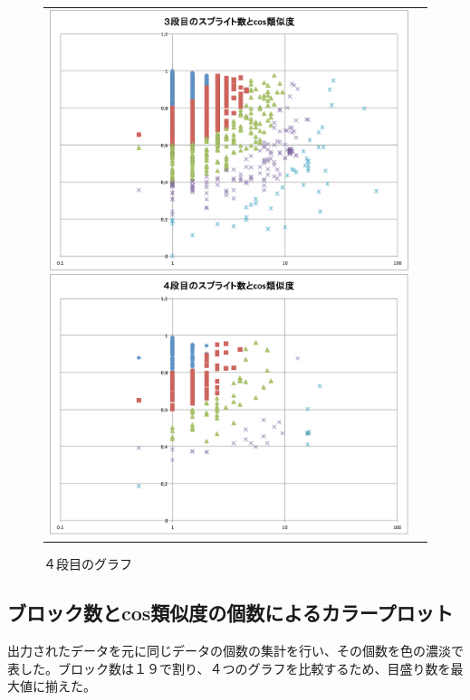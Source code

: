 \documentclass[a4paper,10pt,onecolumn,oneside,openany]{jsbook}
\begin{document}
\begin{figure}[h]
\begin{tabular}{cc}
\begin{minipage}[t]{0.45\hsize}
	 \centering
	 \includegraphics[keepaspectratio, scale = 0.25]{graph_3_splite.pdf}
	 \caption{３段目のグラフ}
	 \label{third_splite}
	\end{minipage}
        \begin{minipage}[t]{0.45\hsize}
	 \centering
	 \includegraphics[keepaspectratio, scale = 0.25]{graph_4_splite.pdf}
	 \caption{４段目のグラフ}
	 \label{fourth_splite}
	\end{minipage}
 \end{tabular}
 \end{figure}
 
\newpage
\subsection{ブロック数とcos類似度の個数によるカラープロット}
出力されたデータを元に同じデータの個数の集計を行い、その個数を色の濃淡で表した。ブロック数は１９で割り、４つのグラフを比較するため、目盛り数を最大値に揃えた。
\end{document}
